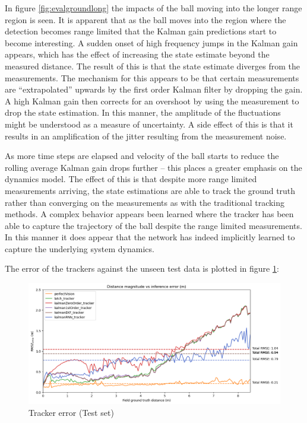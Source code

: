 \documentclass[a4paper,twoside,12pt]{report}
\begin{document}
In figure \ref{fig:evalgroundlong} the impacts of the ball moving into the longer range region is seen. It is apparent that as the ball moves into the region where the detection becomes range limited that the Kalman gain predictions start to become interesting. A sudden onset of high frequency jumps in the Kalman gain appears, which has the effect of increasing the state estimate beyond the measured distance. The result of this is that the state estimate diverges from the measurements. The mechanism for this appears to be that certain measurements are ``extrapolated'' upwards by the first order Kalman filter by dropping the gain. A high Kalman gain then corrects for an overshoot by using the measurement to drop the state estimation. In this manner, the amplitude of the fluctuations might be understood as a measure of uncertainty. A side effect of this is that it results in an amplification of the jitter resulting from the measurement noise.

As more time steps are elapsed and velocity of the ball starts to reduce the rolling average Kalman gain drops further -- this places a greater emphasis on the dynamics model. The effect of this is that despite more range limited measurements arriving, the state estimations are able to track the ground truth rather than converging on the measurements as with the traditional tracking methods. A complex behavior appears been learned where the tracker has been able to capture the trajectory of the ball despite the range limited measurements. In this manner it does appear that the network has indeed implicitly learned to capture the underlying system dynamics. 

The error of the trackers against the unseen test data is plotted in figure \ref{fig:evalerror}:

\begin{figure}[h!]
\begin{center}
\includegraphics[width=13cm]{images/eval_error.png}
\caption{Tracker error (Test set)}
\label{fig:evalerror}
\end{center}
\end{figure}
\end{document}
